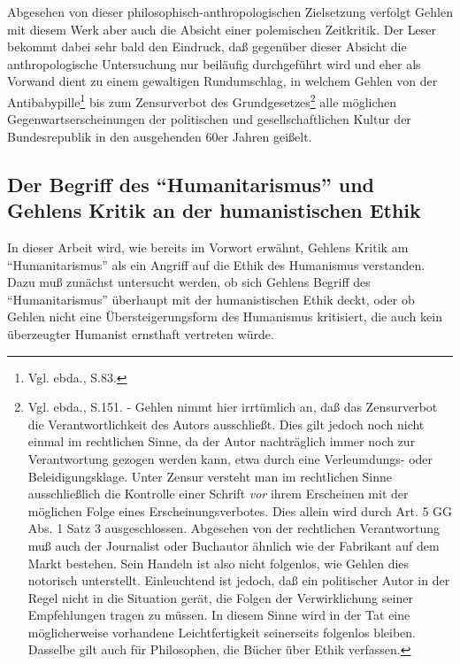\documentclass[12pt,a4paper]{article}
\begin{document}
Abgesehen von dieser philosophisch-anthropologischen Zielsetzung
verfolgt Gehlen mit diesem Werk aber auch die Absicht einer
polemischen Zeitkritik.  Der Leser bekommt dabei sehr bald den
Eindruck, daß gegenüber dieser Absicht die anthropologische
Untersuchung nur beiläufig durchgeführt wird und eher als Vorwand
dient zu einem gewaltigen Rundumschlag, in welchem Gehlen von der
Antibabypille\footnote{Vgl. ebda., S.83.} bis zum Zensurverbot des
Grundgesetzes\footnote{Vgl. ebda., S.151. - Gehlen nimmt hier
irrtümlich an, daß das Zensurverbot die Verantwortlichkeit des Autors
ausschließt. Dies gilt jedoch noch nicht einmal im rechtlichen Sinne,
da der Autor nachträglich immer noch zur Verantwortung gezogen werden
kann, etwa durch eine Verleumdungs- oder Beleidigungsklage. Unter
Zensur versteht man im rechtlichen Sinne ausschließlich die Kontrolle
einer Schrift {\em vor} ihrem Erscheinen mit der möglichen Folge eines
Erscheinungsverbotes. Dies allein wird durch Art. 5 GG Abs. 1 Satz 3
ausgeschlossen. Abgesehen von der rechtlichen Verantwortung muß auch
der Journalist oder Buchautor ähnlich wie der Fabrikant auf dem Markt
bestehen. Sein Handeln ist also nicht folgenlos, wie Gehlen dies
notorisch unterstellt. Einleuchtend ist jedoch, daß ein politischer
Autor in der Regel nicht in die Situation gerät, die Folgen der
Verwirklichung seiner Empfehlungen tragen zu müssen. In diesem Sinne
wird in der Tat eine möglicherweise vorhandene Leichtfertigkeit
seinerseits folgenlos bleiben. Dasselbe gilt auch für Philosophen, die
Bücher über Ethik verfassen.} alle möglichen Gegenwartserscheinungen
der politischen und gesellschaftlichen Kultur der Bundesrepublik in
den ausgehenden 60er Jahren geißelt.

\subsection{Der Begriff des "`Humanitarismus"' und Gehlens Kritik an der humanistischen Ethik}

In dieser Arbeit wird, wie bereits im Vorwort erwähnt, Gehlens Kritik am
"`Humanitarismus"' als ein Angriff auf die Ethik des Humanismus verstanden.
Dazu muß zunächst untersucht werden, ob sich Gehlens Begriff des
"`Humanitarismus"' überhaupt mit der humanistischen Ethik deckt, oder ob
Gehlen nicht eine Übersteigerungsform des Humanismus kritisiert, die auch
kein überzeugter Humanist ernsthaft vertreten würde.
\end{document}
